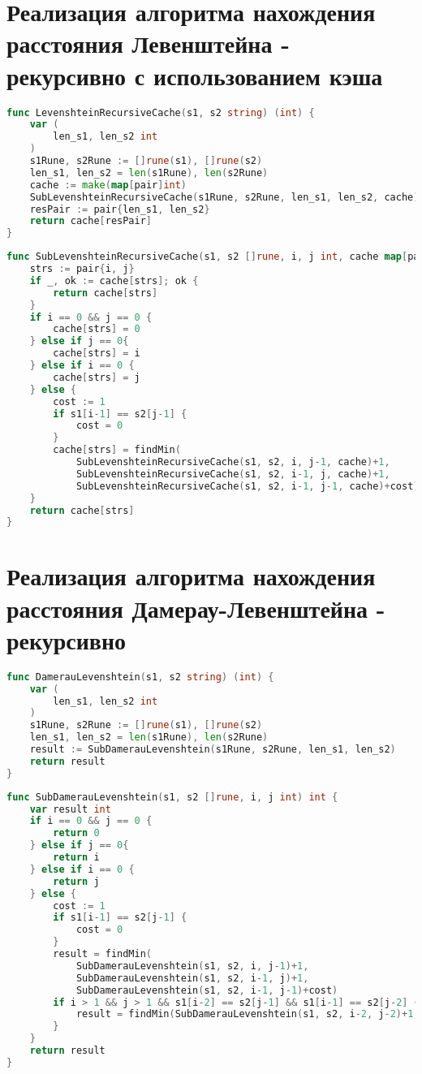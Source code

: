 \section{Реализация алгоритма нахождения расстояния Левенштейна - рекурсивно с использованием кэша}

\begin{lstlisting}[language=Go, caption=Реализация алгоритма Левенштейна рекурсивным способом с использованием кэширования, label=lst_rec_cache]
func LevenshteinRecursiveCache(s1, s2 string) (int) {
	var (
		len_s1, len_s2 int
	)
	s1Rune, s2Rune := []rune(s1), []rune(s2)
	len_s1, len_s2 = len(s1Rune), len(s2Rune)
	cache := make(map[pair]int)
	SubLevenshteinRecursiveCache(s1Rune, s2Rune, len_s1, len_s2, cache)
	resPair := pair{len_s1, len_s2}
	return cache[resPair]
}
\end{lstlisting}

\begin{lstlisting}[language=Go, caption=Вспомогательная функция SubLevenshteinRecursiveCache, label=distrec]	
func SubLevenshteinRecursiveCache(s1, s2 []rune, i, j int, cache map[pair]int) int {
	strs := pair{i, j}
	if _, ok := cache[strs]; ok {
		return cache[strs]
	}
	if i == 0 && j == 0 {
		cache[strs] = 0
	} else if j == 0{
		cache[strs] = i
	} else if i == 0 {
		cache[strs] = j
	} else {
		cost := 1
		if s1[i-1] == s2[j-1] {
			cost = 0
		}
		cache[strs] = findMin(
			SubLevenshteinRecursiveCache(s1, s2, i, j-1, cache)+1,
			SubLevenshteinRecursiveCache(s1, s2, i-1, j, cache)+1,
			SubLevenshteinRecursiveCache(s1, s2, i-1, j-1, cache)+cost)
	}
	return cache[strs]
}
\end{lstlisting}

\section{Реализация алгоритма нахождения расстояния Дамерау-Левенштейна - рекурсивно}
\begin{lstlisting}[language=Go, caption=Реализация алгоритма Дамерау-Левенштейна рекурсивным способом, label=lst_dam]
func DamerauLevenshtein(s1, s2 string) (int) {
	var (
		len_s1, len_s2 int
	)
	s1Rune, s2Rune := []rune(s1), []rune(s2)
	len_s1, len_s2 = len(s1Rune), len(s2Rune)
	result := SubDamerauLevenshtein(s1Rune, s2Rune, len_s1, len_s2)
	return result
}
\end{lstlisting}

\begin{lstlisting}[language=Go, caption=Вспомогательная функция, label=dl]	
func SubDamerauLevenshtein(s1, s2 []rune, i, j int) int {
	var result int
	if i == 0 && j == 0 {
		return 0
	} else if j == 0{
		return i
	} else if i == 0 {
		return j
	} else {
		cost := 1
		if s1[i-1] == s2[j-1] {
			cost = 0
		}
		result = findMin(
			SubDamerauLevenshtein(s1, s2, i, j-1)+1,
			SubDamerauLevenshtein(s1, s2, i-1, j)+1,
			SubDamerauLevenshtein(s1, s2, i-1, j-1)+cost)
		if i > 1 && j > 1 && s1[i-2] == s2[j-1] && s1[i-1] == s2[j-2] {
			result = findMin(SubDamerauLevenshtein(s1, s2, i-2, j-2)+1, result)
		}
	}
	return result
}
\end{lstlisting}

